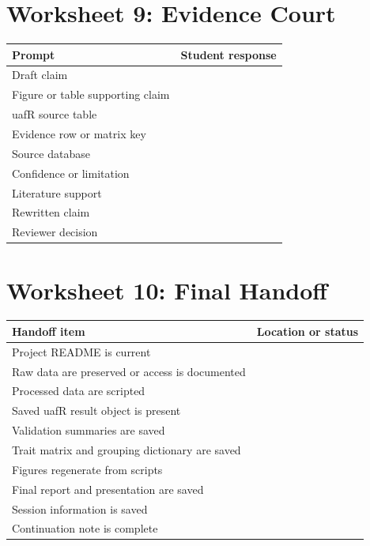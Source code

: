 \section{Worksheet 9: Evidence Court}
\begin{tabularx}{\textwidth}{p{}Y}
\toprule
\textbf{Prompt} & \textbf{Student response}\\
\midrule
Draft claim & \rule{0pt}{3em}\\
Figure or table supporting claim & \rule{0pt}{2.5em}\\
uafR source table & \rule{0pt}{2.5em}\\
Evidence row or matrix key & \rule{0pt}{2.5em}\\
Source database & \rule{0pt}{2.5em}\\
Confidence or limitation & \rule{0pt}{3em}\\
Literature support & \rule{0pt}{3em}\\
Rewritten claim & \rule{0pt}{4em}\\
Reviewer decision & \rule{0pt}{2.5em}\\
\bottomrule
\end{tabularx}

\section{Worksheet 10: Final Handoff}
\begin{tabularx}{\textwidth}{p{}Y}
\toprule
\textbf{Handoff item} & \textbf{Location or status}\\
\midrule
Project README is current & \rule{0pt}{2em}\\
Raw data are preserved or access is documented & \rule{0pt}{2em}\\
Processed data are scripted & \rule{0pt}{2em}\\
Saved uafR result object is present & \rule{0pt}{2em}\\
Validation summaries are saved & \rule{0pt}{2em}\\
Trait matrix and grouping dictionary are saved & \rule{0pt}{2em}\\
Figures regenerate from scripts & \rule{0pt}{2em}\\
Final report and presentation are saved & \rule{0pt}{2em}\\
Session information is saved & \rule{0pt}{2em}\\
Continuation note is complete & \rule{0pt}{2em}\\
\bottomrule
\end{tabularx}
